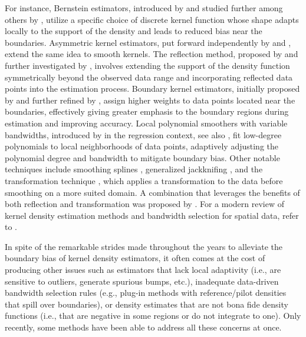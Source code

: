 \documentclass[bj,authoryear]{imsart}
\numberwithin{equation}{section}
\theoremstyle{plain}
\theoremstyle{remark}
\newcommand{\1}{\mathds{1}}
\begin{document}
    For instance, Bernstein estimators, introduced by \cite{Vitale1975} and studied further among others by \cite{GawronskiStadtmuller1981,Petrone1999,Ghosal2001,BabuChaubey2006,PetroneWasserman2002}, utilize a specific choice of discrete kernel function whose shape adapts locally to the support of the density and leads to reduced bias near the boundaries. Asymmetric kernel estimators, put forward independently by \cite{AitchisonLauder1985} and \cite{Chen1999}, extend the same idea to smooth kernels. The reflection method, proposed by \cite{Schuster1985} and further investigated by \cite{ClineHart1991}, involves extending the support of the density function symmetrically beyond the observed data range and incorporating reflected data points into the estimation process. Boundary kernel estimators, initially proposed by \cite{GasserMuller1979} and further refined by \cite{GasserMullerMammitzsch1985,Muller1991,Jones1993,ZhangKarunamuni1998,ZhangKarunamuni2000}, assign higher weights to data points located near the boundaries, effectively giving greater emphasis to the boundary regions during estimation and improving accuracy. Local polynomial smoothers with variable bandwidths, introduced by \cite{FanGijbels1992} in the regression context, see also \cite{FanGijbels1996,ChengFanMarron1997}, fit low-degree polynomials to local neighborhoods of data points, adaptively adjusting the polynomial degree and bandwidth to mitigate boundary bias. Other notable techniques include smoothing splines \citep{Gu1993,GuQiu1993}, generalized jackknifing \citep{Jones1993,JonesFoster1996}, and the transformation technique \citep{MarronRuppert1994,RupperCline1994}, which applies a transformation to the data before smoothing on a more suited domain. A combination that leverages the benefits of both reflection and transformation was proposed by \cite{ZhangKarunamuniJones1999}. For a modern review of kernel density estimation methods and bandwidth selection for spatial data, refer to \cite{DaviesMarshallHazelton2018}.

    In spite of the remarkable strides made throughout the years to alleviate the boundary bias of kernel density estimators, it often comes at the cost of producing other issues such as estimators that lack local adaptivity (i.e., are sensitive to outliers, generate spurious bumps, etc.), inadequate data-driven bandwidth selection rules (e.g., plug-in methods with reference/pilot densities that spill over boundaries), or density estimates that are not bona fide density functions (i.e., that are negative in some regions or do not integrate to one). Only recently, some methods have been able to address all these concerns at once.
\end{document}
